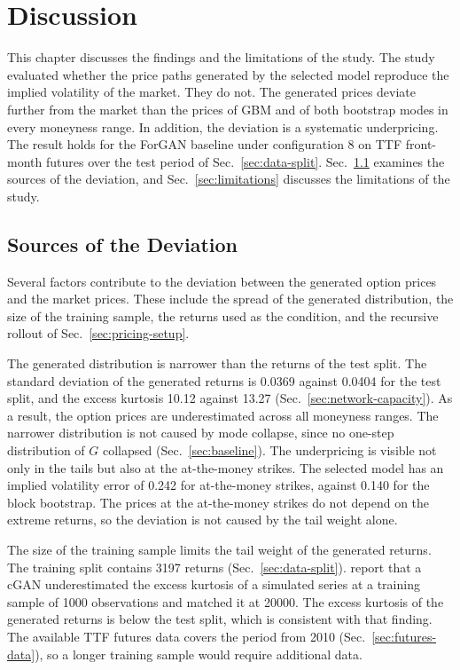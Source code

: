 \section{Discussion}\label{sec:discussion}
This chapter discusses the findings and the limitations of the study. The study evaluated whether the price paths generated by the selected model reproduce the implied volatility of the market. They do not. The generated prices deviate further from the market than the prices of GBM and of both bootstrap modes in every moneyness range. In addition, the deviation is a systematic underpricing. The result holds for the ForGAN baseline under configuration 8 on TTF front-month futures over the test period of Sec.~\ref{sec:data-split}. Sec.~\ref{sec:deviation-sources} examines the sources of the deviation, and Sec.~\ref{sec:limitations} discusses the limitations of the study.

\subsection{Sources of the Deviation}\label{sec:deviation-sources}

Several factors contribute to the deviation between the generated option prices and the market prices. These include the spread of the generated distribution, the size of the training sample, the returns used as the condition, and the recursive rollout of Sec.~\ref{sec:pricing-setup}.

The generated distribution is narrower than the returns of the test split. The standard deviation of the generated returns is \num{0.0369} against \num{0.0404} for the test split, and the excess kurtosis \num{10.12} against \num{13.27} (Sec.~\ref{sec:network-capacity}). As a result, the option prices are underestimated across all moneyness ranges. The narrower distribution is not caused by mode collapse, since no
one-step distribution of $G$ collapsed (Sec.~\ref{sec:baseline}).
The underpricing is visible not only in the tails but also at the at-the-money strikes. The selected model has an implied volatility error of \num{0.242} for at-the-money strikes, against \num{0.140} for the block bootstrap. The prices at the at-the-money strikes do not depend on the extreme returns, so the deviation is not caused by the tail weight alone. 

The size of the training sample limits the tail weight of the generated returns. The training split contains \num{3197} returns (Sec.~\ref{sec:data-split}). \textcite{fuTimeSeriesSimulation2019} report that a cGAN underestimated the excess kurtosis of a simulated series at a training sample of \num{1000} observations and matched it at \num{20000}. The excess kurtosis of the generated returns is below the test split, which is consistent with that finding. The available TTF futures data covers the period from 2010 (Sec.~\ref{sec:futures-data}), so a longer training sample would require additional data.

